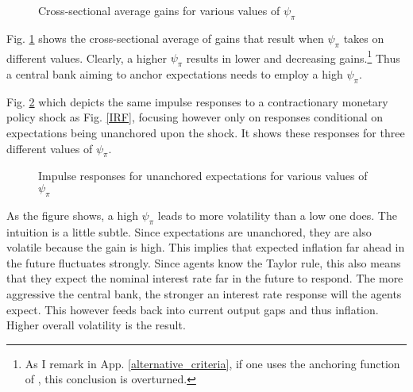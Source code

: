 \documentclass[11pt]{article}
\def \myFigPath {../../figures/}
\renewcommand{\[}{\begin{equation}}
\renewcommand{\]}{\end{equation}}
\def\fignameGainPsiSmall{command_IFS_anchoring_pretty_invgain_again_critCUSUM_constant_only_params_psi_pi_1_01_psi_x_0_gbar_0_145_thetbar_16_thettilde_2_5_kap_0_8_lamx_0_lami_0_2020_06_05}
\def\fignameGainPsiMedium{command_IFS_anchoring_pretty_invgain_again_critCUSUM_constant_only_params_psi_pi_1_5_psi_x_0_gbar_0_145_thetbar_16_thettilde_2_5_kap_0_8_lamx_0_lami_0_2020_06_05}
\def\fignameGainPsiBig{command_IFS_anchoring_pretty_invgain_again_critCUSUM_constant_only_params_psi_pi_2_psi_x_0_gbar_0_145_thetbar_16_thettilde_2_5_kap_0_8_lamx_0_lami_0_2020_06_05}
\def\fignameIRFpsipiSmall{command_IFS_anchoring_pretty_RIR_LH_unanch_monpol_again_critCUSUM_constant_only_T_400_N_1000_burnin_5_params_psi_pi_1_01_psi_x_0_gbar_0_145_thetbar_16_thettilde_2_5_kap_0_8_lamx_0_lami_0_date_2020_06_05}
\def\fignameIRFpsipiMedium{command_IFS_anchoring_pretty_RIR_LH_unanch_monpol_again_critCUSUM_constant_only_T_400_N_1000_burnin_5_params_psi_pi_1_5_psi_x_0_gbar_0_145_thetbar_16_thettilde_2_5_kap_0_8_lamx_0_lami_0_date_2020_06_05}
\def\fignameIRFpsipiBig{command_IFS_anchoring_pretty_RIR_LH_unanch_monpol_again_critCUSUM_constant_only_T_400_N_1000_burnin_5_params_psi_pi_2_psi_x_0_gbar_0_145_thetbar_16_thettilde_2_5_kap_0_8_lamx_0_lami_0_date_2020_06_05}
\begin{document}
\begin{figure}[h!]
\caption{Cross-sectional average gains for various values of $\psi_{\pi}$}
\label{anchor_psi}
\end{figure}

Fig. \ref{anchor_psi} shows the cross-sectional average of gains that result when $\psi_{\pi}$ takes on different values. Clearly, a higher $\psi_{\pi}$ results in lower and decreasing gains.\footnote{As I remark in App. \ref{alternative_criteria}, if one uses the anchoring function of \cite{carvalho2019anchored}, this conclusion is overturned.} Thus a central bank aiming to anchor expectations needs to employ a high $\psi_{\pi}$. 

Fig. \ref{IRF_unanchored_psi} which depicts the same impulse responses to a contractionary monetary policy shock as Fig. \ref{IRF}, focusing however only on responses conditional on expectations being unanchored upon the shock. It shows these responses for three different values of $\psi_{\pi}$.

\begin{figure}[h!]
\caption{Impulse responses for unanchored expectations for various values of $\psi_{\pi}$}
\label{IRF_unanchored_psi}
\end{figure}

As the figure shows, a high $\psi_{\pi}$ leads to more volatility than a low one does. The intuition is a little subtle. Since expectations are unanchored, they are also volatile because the gain is high. This implies that expected inflation far ahead in the future fluctuates strongly. Since agents know the Taylor rule, this also means that they expect the nominal interest rate far in the future to respond. The more aggressive the central bank, the stronger an interest rate response will the agents expect. This however feeds back into current output gaps and thus inflation. Higher overall volatility is the result.
\end{document}
